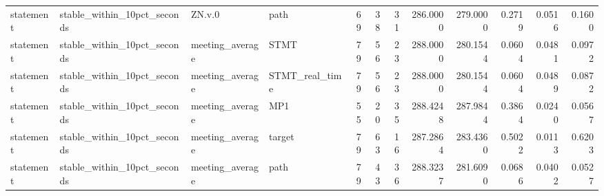\begin{tabular}{llllrrrrrrrr}
statement & stable_within_10pct_seconds & ZN.v.0 & path & 69 & 38 & 31 & 286.0000 & 279.0000 & 0.2719 & 0.0516 & 0.1600 \\
statement & stable_within_10pct_seconds & meeting_average & STMT & 79 & 56 & 23 & 288.0000 & 280.1544 & 0.0604 & 0.0481 & 0.0972 \\
statement & stable_within_10pct_seconds & meeting_average & STMT_real_time & 79 & 56 & 23 & 288.0000 & 280.1544 & 0.0604 & 0.0489 & 0.0872 \\
statement & stable_within_10pct_seconds & meeting_average & MP1 & 55 & 20 & 35 & 288.4248 & 287.9844 & 0.3864 & 0.0240 & 0.0567 \\
statement & stable_within_10pct_seconds & meeting_average & target & 79 & 63 & 16 & 287.2864 & 283.4360 & 0.5022 & 0.0113 & 0.6203 \\
statement & stable_within_10pct_seconds & meeting_average & path & 79 & 43 & 36 & 288.3237 & 281.6090 & 0.0686 & 0.0402 & 0.0527 \\
\bottomrule
\end{tabular}

